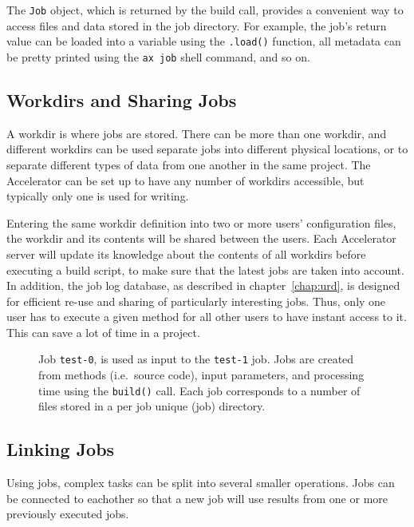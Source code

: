 The \texttt{Job} object, which is returned by the build call, provides
a convenient way to access files and data stored in the job directory.
For example, the job's return value can be loaded into a variable
using the \texttt{.load()} function, all metadata can be pretty
printed using the \texttt{ax job} shell command, and so on.


\subsection{Workdirs and Sharing Jobs}

A workdir is where jobs are stored.  There can be more than one
workdir, and different workdirs can be used separate jobs into
different physical locations, or to separate different types of data
from one another in the same project.  The Accelerator can be set up
to have any number of workdirs accessible, but typically only one is
used for writing.

Entering the same workdir definition into two or more users'
configuration files, the workdir and its contents will be shared
between the users.  Each Accelerator server will update its knowledge
about the contents of all workdirs before executing a build script, to
make sure that the latest jobs are taken into account.  In addition,
the job log database, as described in chapter~\ref{chap:urd}, is
designed for efficient re-use and sharing of particularly interesting
jobs.  Thus, only one user has to execute a given method for all other
users to have instant access to it.  This can save a lot of time in a
project.


\begin{figure}[b]
    \hspace{1.5cm}
    \caption{Job \texttt{test-0}, is used as input to the
      \texttt{test-1} job.  Jobs are created from methods
      (i.e.\ source code), input parameters, and processing time using
      the \texttt{build()} call.  Each job corresponds to a number of
      files stored in a per job unique (job) directory.}
    \label{fig:execflow-print-result}
\end{figure}




\subsection{Linking Jobs}

Using jobs, complex tasks can be split into several smaller
operations.  Jobs can be connected to eachother so that a new job will
use results from one or more previously executed jobs.


